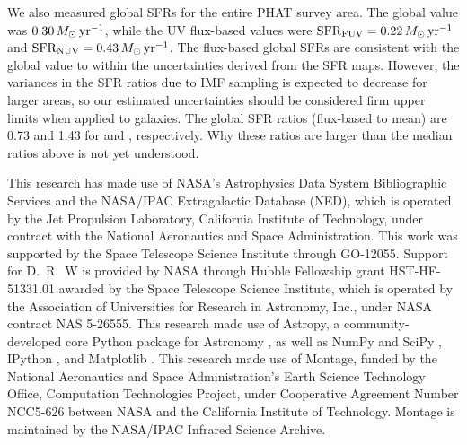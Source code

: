 \documentclass[iop, tighten]{emulateapj}
\begin{document}
We also measured global SFRs for the entire PHAT survey area. The global
\sfroneh{} value was $0.30\,M_\odot\,\mathrm{yr}^{-1}$, while the UV flux-based values were
$\mathrm{SFR}_{\mathrm{FUV}} = 0.22\,M_\odot\,\mathrm{yr}^{-1}$ and $\mathrm{SFR}_{\mathrm{NUV}} = 0.43\,M_\odot\,\mathrm{yr}^{-1}$. The flux-based
global SFRs are consistent with the global \sfroneh{} value to within the
uncertainties derived from the SFR maps. However, the variances in the SFR
ratios due to IMF sampling is expected to decrease for larger areas, so our
estimated uncertainties should be considered firm upper limits when applied to
galaxies. The global SFR ratios (flux-based to mean) are 0.73 and 1.43 for
\fuv{} and \nuv{}, respectively. Why these ratios are larger than the median
ratios above is not yet understood.

This research has made use of NASA's Astrophysics Data System Bibliographic
Services and the NASA/IPAC Extragalactic Database (NED), which is operated by
the Jet Propulsion Laboratory, California Institute of Technology, under
contract with the National Aeronautics and Space Administration. This work was
supported by the Space Telescope Science Institute through GO-12055. Support
for D.~R.~W is provided by NASA through Hubble Fellowship grant HST-HF-51331.01
awarded by the Space Telescope Science Institute, which is operated by the
Association of Universities for Research in Astronomy, Inc., under NASA
contract NAS 5-26555. This research made use of Astropy, a community-developed
core Python package for Astronomy \citep{Astropy_Collaboration:2013}, as well
as NumPy and SciPy \citep{Oliphant:2007}, IPython \citep{Perez:2007}, and
Matplotlib \citep{Hunter:2007}. This research made use of Montage, funded by
the National Aeronautics and Space Administration's Earth Science Technology
Office, Computation Technologies Project, under Cooperative Agreement Number
NCC5-626 between NASA and the California Institute of Technology. Montage is
maintained by the NASA/IPAC Infrared Science Archive.






\end{document}
